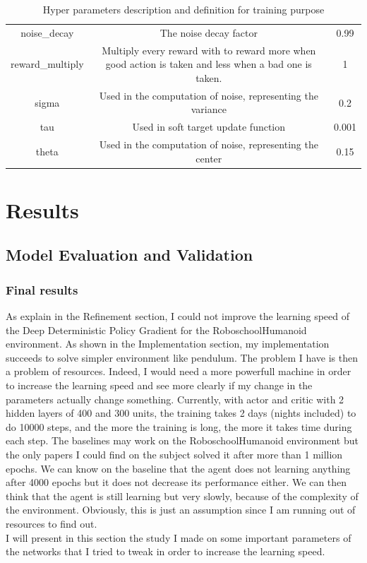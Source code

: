 \documentclass{article}
\begin{document}
\begin{table}[ht]
\begin{adjustbox}{width=1\textwidth}
\begin{tabular}{ |c|c|c| }
      noise\_decay & The noise decay factor & 0.99 \\
      reward\_multiply & Multiply every reward with to reward more when good action is taken and less when a bad one is taken. & 1 \\
      sigma & Used in the computation of noise, representing the variance & 0.2 \\
      tau & Used in soft target update function & 0.001 \\
      theta & Used in the computation of noise, representing the center & 0.15 \\
      \hline
    \end{tabular}
  \end{adjustbox}
  \caption{Hyper parameters description and definition for training purpose}
  \label{tab:hyperparams}
\end{table}


\newpage
\section{Results}

\subsection{Model Evaluation and Validation}
\paragraph{}

\subsubsection{Final results}

As explain in the Refinement section, I could not improve the learning speed of
the Deep Deterministic Policy Gradient for the RoboschoolHumanoid environment.
As shown in the Implementation section, my implementation succeeds to solve
simpler environment like pendulum. The problem I have is then a problem of
resources. Indeed, I would need a more powerfull machine in order to increase
the learning speed and see more clearly if my change in the parameters actually
change something. Currently, with actor and critic with 2 hidden layers of 400
and 300 units, the training takes 2 days (nights included) to do 10000 steps,
and the more the training is long, the more it takes time during each step.
The baselines may work on the RoboschoolHumanoid environment
but the only papers I could find on the subject solved it after more than 1
million epochs. We can know on the baseline that the agent does not learning anything
after 4000 epochs but it does not decrease its performance either. We can then
think that the agent is still learning but very slowly, because of the
complexity of the environment. Obviously, this is just an assumption since I am
running out of resources to find out. \\
I will present in this section the study I made on some important parameters of
the networks that I tried to tweak in order to increase the learning speed.
\end{document}

